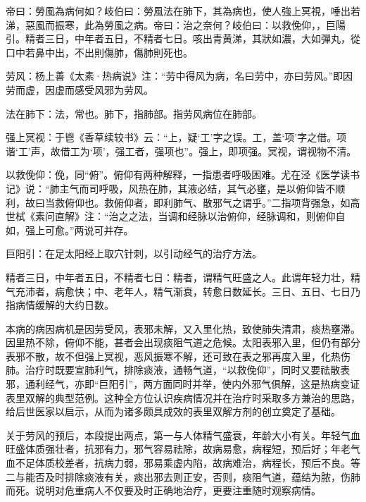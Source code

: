 \documentclass[draft,12pt]{ctexbook}
\begin{document}
\begin{yuanwen}
帝曰：勞風為病何如？岐伯曰：勞風法在肺下，其為病也，使人強上冥視，唾出若涕，惡風而振寒，此為勞風之病。帝曰：治之奈何？岐伯曰：以救俛仰，，巨陽引。精者三日，中年者五日，不精者七日。咳出青黄涕，其狀如濃，大如彈丸，從口中若鼻中出，不出則傷肺，傷肺則死也。
\end{yuanwen}


\begin{jiaozhu}
  \item 劳风：杨上善《太素·热病说》注：“劳中得风为病，名曰劳中，亦曰劳风。”即因劳而虚，因虚而感受风邪为劳风。
  \item 法在肺下：法，常也。肺下，指肺部。指劳风病位在肺部。
  \item 强上冥视：于鬯《香草续较书》云：“上，疑‘工’字之误。工，盖‘项’字之借。项谐‘工’声，故借工为‘项’，强工者，强项也”。强上，即项强。冥视，谓视物不清。
  \item 以救俛仰：俛，同“俯”。俯仰有两种解释，一指患者呼吸困难。尤在泾《医学读书记》说：“肺主气而司呼吸，风热在肺，其液必结，其气必壅，是以俯仰皆不顺利，故曰当救俯仰也。救俯仰者，即利肺气、散邪气之谓乎。”二指项背强急，如高世栻《素问直解》注：“治之之法，当调和经脉以治俯仰，经脉调和，则俯仰自如，强上可愈。”两说可并存。
  \item 巨阳引：在足太阳经上取穴针刺，以引动经气的治疗方法。
  \item 精者三日，中年者五日，不精者七日：精者，谓精气旺盛之人。此谓年轻力壮，精气充沛者，病愈快；中、老年人，精气渐衰，转愈日数延长。三日、五日、七日乃指病情缓解的大约日数。
\end{jiaozhu}



本病的病因病机是因劳受风，表邪未解，又入里化热，致使肺失清肃，痰热壅滞。因里热不除，俯仰不能，甚者会出现痰阻气道之危候。太阳表邪入里，但仍有部分表邪不散，故不但强上冥视，恶风振寒不解，还可致在表之邪再度入里，化热伤肺。治疗时既要宣肺利气，排除痰液，通畅气道，“以救俛仰”，同时又要祛散表邪，通利经气，亦即“巨阳引”，两方面同时并举，使内外邪气俱解，这是热病变证表里双解的典型范例。这种全方位认识疾病情况并在治疗时采取多方兼治的思路，给后世医家以启示，从而为诸多颇具成效的表里双解方剂的创立奠定了基础。

关于劳风的预后，本段提出两点，第一与人体精气盛衰，年龄大小有关。年轻气血旺盛体质强壮者，抗邪有力，邪气容易祛除，故病易愈，病程短，预后好；年老气血不足体质校差者，抗病力弱，邪易乘虚内陷，故病难治，病程长，预后不良。等二与能否及时排除痰液有关，痰出邪去则正安，否则，痰阻气道，蕴结为脓，伤肺而死。说明对危重病人不仅要及时正确地治疗，更要注重随时观察病情。
\end{document}
